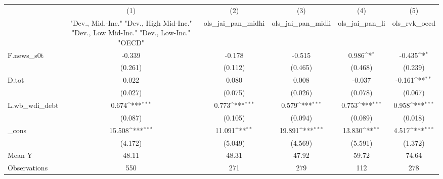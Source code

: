 {
\def\sym#1{\ifmmode^{#1}\else\(^{#1}\)\fi}
\begin{tabular}{l*{5}{c}}
\toprule
            &\multicolumn{1}{c}{(1)}&\multicolumn{1}{c}{(2)}&\multicolumn{1}{c}{(3)}&\multicolumn{1}{c}{(4)}&\multicolumn{1}{c}{(5)}\\
            &\multicolumn{1}{c}{ "Dev., Mid.-Inc." "Dev., High Mid-Inc." "Dev., Low Mid-Inc." "Dev., Low-Inc." "OECD" }&\multicolumn{1}{c}{ols\_jai\_pan\_midhi}&\multicolumn{1}{c}{ols\_jai\_pan\_midli}&\multicolumn{1}{c}{ols\_jai\_pan\_li}&\multicolumn{1}{c}{ols\_rvk\_oecd}\\
\midrule
F.news\_s0t  &      -0.339         &      -0.178         &      -0.515         &       0.986\sym{*}  &      -0.435\sym{*}  \\
            &     (0.261)         &     (0.112)         &     (0.465)         &     (0.468)         &     (0.239)         \\
\addlinespace
D.tot       &       0.022         &       0.080         &       0.008         &      -0.037         &      -0.161\sym{**} \\
            &     (0.027)         &     (0.075)         &     (0.026)         &     (0.078)         &     (0.067)         \\
\addlinespace
L.wb\_wdi\_debt&       0.674\sym{***}&       0.773\sym{***}&       0.579\sym{***}&       0.753\sym{***}&       0.958\sym{***}\\
            &     (0.087)         &     (0.105)         &     (0.094)         &     (0.089)         &     (0.018)         \\
\addlinespace
\_cons      &      15.508\sym{***}&      11.091\sym{**} &      19.891\sym{***}&      13.830\sym{**} &       4.517\sym{***}\\
            &     (4.172)         &     (5.049)         &     (4.569)         &     (5.591)         &     (1.372)         \\
\midrule
Mean Y      &       48.11         &       48.31         &       47.92         &       59.72         &       74.64         \\
Observations&         550         &         271         &         279         &         112         &         278         \\
\bottomrule
\end{tabular}
}
